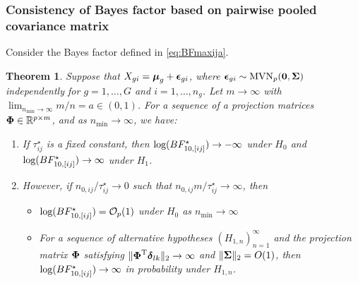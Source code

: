 \documentclass[pdflatex,sn-basic]{sn-jnl}%
\def\bzero{{\mathbf 0}}
\def\log{\hbox{log}}
\def\MVN{\hbox{MVN}}
\def\log{\hbox{log}}
\def\trans{^{\rm T}}
\def\bzero{{\mathbf 0}}
\newcommand{\bSigma}{\mbox{\boldmath $\Sigma$}}
\newcommand{\udelta}            {\mbox{\boldmath$\delta$}}
\newcommand{\uepsilon}          {\mbox{\boldmath$\epsilon$}}
\newcommand{\umu}               {\mbox{\boldmath$\mu$}}
\newcommand{\uSigma}            {\mbox{\boldmath$\Sigma$}}
\newcommand{\uPhi}              {\mbox{\boldmath$\Phi$}}
\theoremstyle{thmstyleone}%
\newtheorem{theorem}{Theorem}%
\theoremstyle{thmstyletwo}%
\theoremstyle{thmstylethree}%
\begin{document}
\subsubsection{Consistency of Bayes factor based on pairwise pooled covariance matrix}
Consider the Bayes factor defined in \eqref{eq:BFmaxija}. 
\begin{theorem}\label{Thrm2}
Suppose that $X_{gi} = \umu_g + \uepsilon_{gi}$, where $\uepsilon_{gi} \sim \MVN_{p}(\bzero, \uSigma)$ independently for $g = 1, \ldots, G$ and $i = 1,\ldots,n_g$. Let $m \rightarrow \infty$ with $ \lim_{n_{\min} \rightarrow \infty} m / n =  a \in  (0, 1)$. For a sequence of a projection matrices $\uPhi \in \mathbb{R}^{p \times m}$, and as $n_{\min} \rightarrow \infty$, we have:
\begin{enumerate}
    \item If $\tau^{\star}_{ij}$ is a fixed constant, 
    then $\log(BF^{\star}_{10, [ij]}) \rightarrow -\infty$ under $H_0$ and $\log(BF^{\star}_{10, [ij]}) \rightarrow \infty$ under $H_1$. 
    \item However, if $n_{0,ij}/\tau^{\star}_{ij} \rightarrow 0$ such that $n_{0,ij} m/\tau^{\star}_{ij} \rightarrow \infty$, then
    \begin{itemize}
     \item[(a)]  $\log(BF^{\star}_{10, [ij]}) = \mathcal{O}_{p}(1)$ under $H_0$ as $n_{\min} \rightarrow \infty$ 
     \item[(b)] 
     For a sequence of alternative hypotheses $(H_{1,n})_{n = 1}^\infty$ and the projection matrix $\uPhi$ satisfying $\|\uPhi\trans\udelta_{lk}\|_2\to\infty$ and $\|\bSigma\|_2 = O(1)$, then $\log(BF^{\star}_{10, [ij]}) \rightarrow \infty$ in probability under $H_{1,n}$. 
    \end{itemize}
\end{enumerate}
\end{theorem}
\end{document}
